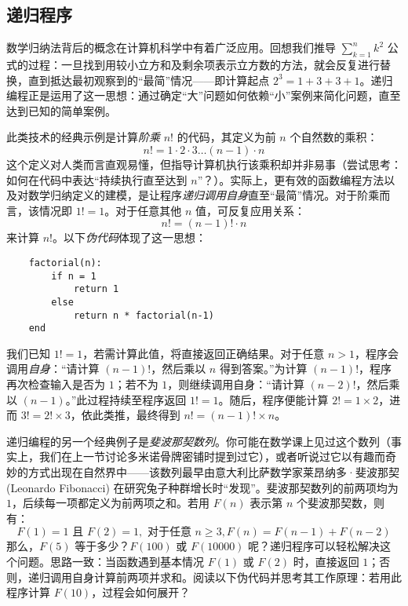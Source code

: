 \subsection{递归程序}\label{sec:section2.5.1}

数学归纳法背后的概念在计算机科学中有着广泛应用。回想我们推导 $\sum_{k=1}^{n}k^2$ 公式的过程：一旦找到用较小立方和及剩余项表示立方数的方法，就会反复进行替换，直到抵达最初观察到的``最简''情况——即计算起点 $2^3=1+3+3+1$。递归编程正是运用了这一思想：通过确定``大''问题如何依赖``小''案例来简化问题，直至达到已知的简单案例。

此类技术的经典示例是计算\emph{阶乘} $n!$ 的代码，其定义为前 $n$ 个自然数的乘积：
\[n! = 1 \cdot 2 \cdot 3 \dots (n - 1) \cdot n\]
这个定义对人类而言直观易懂，但指导计算机执行该乘积却并非易事（尝试思考：如何在代码中表达``持续执行直至达到 $n$''？）。实际上，更有效的函数编程方法以及对数学归纳定义的建模，是让程序\emph{递归调用自身}直至``最简''情况。对于阶乘而言，该情况即 $1! = 1$。对于任意其他 $n$ 值，可反复应用关系：
\[n! = (n - 1)! \cdot n\]
来计算 $n!$。以下\emph{伪代码}体现了这一思想：

\begin{verbatim}
    factorial(n):
        if n = 1
            return 1
        else
            return n * factorial(n-1)
    end
\end{verbatim}

我们已知 $1! = 1$，若需计算此值，将直接返回正确结果。对于任意 $n > 1$，程序会调用\emph{自身}：``请计算 $(n-1)!$，然后乘以 $n$ 得到答案。''为计算 $(n-1)!$，程序再次检查输入是否为 $1$；若不为 $1$，则继续调用自身：``请计算 $(n-2)!$，然后乘以 $(n-1)$。''此过程持续至程序返回 $1! = 1$。随后，程序便能计算 $2! = 1 \times 2$，进而 $3! = 2! \times 3$，依此类推，最终得到 $n! = (n - 1)! \times n$。

\clearpage

递归编程的另一个经典例子是\emph{斐波那契数列}。你可能在数学课上见过这个数列（事实上，我们在上一节讨论多米诺骨牌密铺时提到过它），或者听说过它以有趣而奇妙的方式出现在自然界中——该数列最早由意大利比萨数学家莱昂纳多·斐波那契 (Leonardo Fibonacci) 在研究兔子种群增长时``发现''。斐波那契数列的前两项均为 $1$，后续每一项都定义为前两项之和。若用 $F(n)$ 表示第 $n$ 个斐波那契数，则有：
\[F(1) = 1 \text{\ 且\ }F(2) = 1, \text{ 对于任意\ } n \ge 3, F(n) = F(n - 1) + F(n - 2)\]
那么，$F(5)$ 等于多少？$F(100)$ 或 $F(10000)$ 呢？递归程序可以轻松解决这个问题。思路一致：当函数遇到基本情况 $F(1)$ 或 $F(2)$ 时，直接返回 $1$；否则，递归调用自身计算前两项并求和。阅读以下伪代码并思考其工作原理：若用此程序计算 $F(10)$，过程会如何展开？

